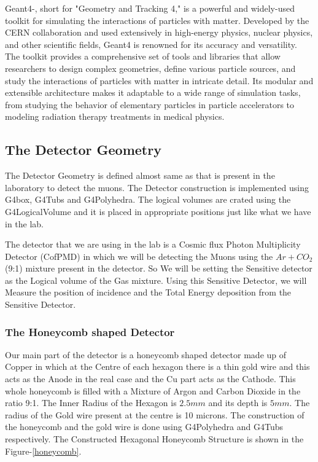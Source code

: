\documentclass{article}
\begin{document}
\begin{multicols}{2}
Geant4-\cite{agostinelli2003geant4}, short for "Geometry and Tracking 4," is a powerful and 
widely-used toolkit for simulating the interactions of particles with matter. 
Developed by the CERN collaboration and used extensively in high-energy physics, 
nuclear physics, and other scientific fields, Geant4 is renowned for its accuracy 
and versatility. The toolkit provides a comprehensive set of tools and 
libraries that allow researchers to design complex geometries, define 
various particle sources, and study the interactions of particles with matter 
in intricate detail. Its modular and extensible architecture makes it adaptable 
to a wide range of simulation tasks, from studying the behavior of elementary 
particles in particle accelerators to modeling radiation therapy treatments in 
medical physics.


\subsection{The Detector Geometry}

The Detector Geometry is defined almost same as that is present in the laboratory to detect the muons. The Detector
construction is implemented using G4box, G4Tubs and G4Polyhedra. The logical volumes are crated using the G4LogicalVolume
and it is placed in appropriate positions just like what we have in the lab.

The detector that we are using in the lab is a Cosmic flux Photon Multiplicity Detector (CofPMD) in which we will be detecting
the Muons using the $Ar+CO_2$ (9:1) mixture present in the detector. So We will be setting the Sensitive detector as the Logical volume
of the Gas mixture. Using this Sensitive Detector, we will Measure the position of incidence and the Total  Energy deposition
from the Sensitive Detector.

\subsubsection{The Honeycomb shaped Detector}

Our main part of the detector is a honeycomb shaped detector made up of Copper in which at the Centre of each
hexagon there is a thin gold wire and this acts as the Anode in the real case and the Cu part acts as the Cathode. This whole
honeycomb is filled with a Mixture of Argon and Carbon Dioxide in the ratio 9:1. The Inner Radius of the Hexagon is $2.5mm$
and its depth is $5mm$. The radius of the Gold wire present at the centre is 10 microns. The construction of the honeycomb
and the gold wire is done using G4Polyhedra and G4Tubs respectively. The Constructed Hexagonal Honeycomb Structure is 
shown in the Figure-\ref{honeycomb}.


\end{multicols}
\end{document}
